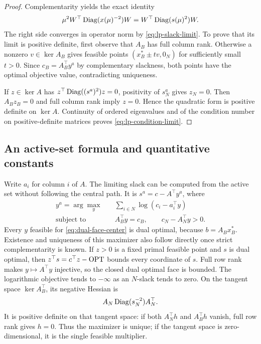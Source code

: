 \begin{proof}
Complementarity yields the exact identity
\[
 \mu^2W^\top\operatorname{Diag}(x(\mu)^{-2})W
 =W^\top\operatorname{Diag}(s(\mu)^2)W.
\]
The right side converges in operator norm by
\eqref{eq:lp-slack-limit}. To prove that its limit is positive
definite, first observe that $A_B$ has full column rank. Otherwise a
nonzero $v\in\ker A_B$ gives feasible points
$(x_B^*\pm tv,0_N)$ for sufficiently small $t>0$. Since
$c_B=A_B^\top y^a$ by complementary slackness, both points have the
optimal objective value, contradicting uniqueness.

If $z\in\ker A$ has
$z^\top\operatorname{Diag}((s^a)^2)z=0$, positivity of $s_N^a$ gives $z_N=0$.
Then $A_Bz_B=0$ and full column rank imply $z=0$. Hence the quadratic
form is positive definite on $\ker A$. Continuity of ordered
eigenvalues and of the condition number on positive-definite matrices
proves \eqref{eq:lp-condition-limit}.
\end{proof}

\subsection{An active-set formula and quantitative constants}

Write $a_i$ for column $i$ of $A$. The limiting slack can be computed
from the active set without following the central path. It is
$s^a=c-A^\top y^a$, where
\begin{equation}
 \begin{aligned}
 y^a=\arg\max_y\quad &\sum_{i\in N}\log(c_i-a_i^\top y)\\
 \text{subject to}\quad&A_B^\top y=c_B,\qquad
 c_N-A_N^\top y>0.
 \end{aligned}
 \label{eq:dual-face-center}
\end{equation}
Every $y$ feasible for \eqref{eq:dual-face-center} is dual optimal,
because $b=A_Bx_B^*$. Existence and uniqueness of this maximizer
also follow directly once strict complementarity is known. If $z>0$ is a fixed
primal feasible point and $s$ is dual optimal, then
$z^\top s=c^\top z-\operatorname{OPT}$ bounds every coordinate of $s$.
Full row rank makes $y\mapsto A^\top y$ injective, so the closed dual
optimal face is bounded. The logarithmic objective tends to
$-\infty$ as an $N$-slack tends to zero. On the tangent space
$\ker A_B^\top$, its negative Hessian is
\[
 A_N\operatorname{Diag}(s_N^{-2})A_N^\top.
\]
It is positive definite on that tangent space: if both $A_N^\top h$
and $A_B^\top h$ vanish, full row rank gives $h=0$. Thus the
maximizer is unique; if the tangent space is zero-dimensional, it is the
single feasible multiplier.

